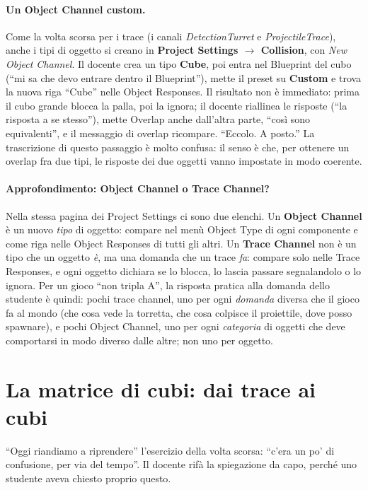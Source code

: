 \paragraph{Un Object Channel custom.} Come la volta scorsa per i trace (i canali
\emph{DetectionTurret} e \emph{ProjectileTrace}), anche i tipi di oggetto si creano in
\textbf{Project Settings $\rightarrow$ Collision}, con \emph{New Object Channel}. Il
docente crea un tipo \textbf{Cube}, poi entra nel Blueprint del cubo (``mi sa che devo
entrare dentro il Blueprint''), mette il preset su \textbf{Custom} e trova la nuova riga
``Cube'' nelle Object Responses. Il risultato non è immediato: prima il cubo grande blocca
la palla, poi la ignora; il docente riallinea le risposte (``la risposta a se stesso''),
mette Overlap anche dall'altra parte, ``così sono equivalenti'', e il messaggio di
overlap ricompare. ``Eccolo. A posto.'' La trascrizione di questo passaggio è molto
confusa: il senso è che, per ottenere un overlap fra due tipi, le risposte dei due
oggetti vanno impostate in modo coerente.

\paragraph{Approfondimento: Object Channel o Trace Channel?} Nella stessa pagina dei
Project Settings ci sono due elenchi. Un \textbf{Object Channel} è un nuovo \emph{tipo}
di oggetto: compare nel menù Object Type di ogni componente e come riga nelle Object
Responses di tutti gli altri. Un \textbf{Trace Channel} non è un tipo che un oggetto
\emph{è}, ma una domanda che un trace \emph{fa}: compare solo nelle Trace Responses, e
ogni oggetto dichiara se lo blocca, lo lascia passare segnalandolo o lo ignora. Per un
gioco ``non tripla A'', la risposta pratica alla domanda dello studente è quindi: pochi
trace channel, uno per ogni \emph{domanda} diversa che il gioco fa al mondo (che cosa
vede la torretta, che cosa colpisce il proiettile, dove posso spawnare), e pochi Object
Channel, uno per ogni \emph{categoria} di oggetti che deve comportarsi in modo diverso
dalle altre; non uno per oggetto.

\section{La matrice di cubi: dai trace ai cubi}
\label{ue6:sec:matrice}

``Oggi riandiamo a riprendere'' l'esercizio della volta scorsa: ``c'era un po' di
confusione, per via del tempo''. Il docente rifà la spiegazione da capo, perché uno
studente aveva chiesto proprio questo.

